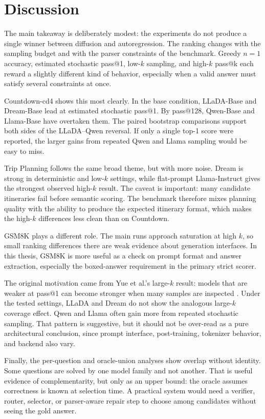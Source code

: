 \section{Discussion}
\label{sec:discussion}

The main takeaway is deliberately modest: the experiments do not produce a
single winner between diffusion and autoregression. The ranking changes with
the sampling budget and with the parser constraints of the benchmark. Greedy
$n=1$ accuracy, estimated stochastic pass@1, low-$k$ sampling, and high-$k$
pass@k each reward a slightly different kind of behavior, especially when a
valid answer must satisfy several constraints at once.

Countdown-cd4 shows this most clearly. In the base condition, LLaDA-Base and
Dream-Base lead at estimated stochastic pass@1. By pass@128, Qwen-Base and
Llama-Base have overtaken them. The paired bootstrap comparisons support both
sides of the LLaDA--Qwen reversal. If only a single top-1 score were reported,
the larger gains from repeated Qwen and Llama sampling would be easy to miss.

Trip Planning follows the same broad theme, but with more noise. Dream is
strong in deterministic and low-$k$ settings, while flat-prompt Llama-Instruct
gives the strongest observed high-$k$ result. The caveat is important: many
candidate itineraries fail before semantic scoring. The benchmark therefore
mixes planning quality with the ability to produce the expected itinerary
format, which makes the high-$k$ differences less clean than on Countdown.

GSM8K plays a different role. The main runs approach saturation at high $k$, so
small ranking differences there are weak evidence about generation interfaces.
In this thesis, GSM8K is more useful as a check on prompt format and answer
extraction, especially the boxed-answer requirement in the primary strict
scorer.

The original motivation came from Yue et al.'s large-$k$ result: models that are
weaker at pass@1 can become stronger when many samples are inspected
\cite{yue2025rlvr}. Under the tested settings, LLaDA and Dream do not show the
analogous large-$k$ coverage effect. Qwen and Llama often gain more from
repeated stochastic sampling. That pattern is suggestive, but it should not be
over-read as a pure architectural conclusion, since prompt interface,
post-training, tokenizer behavior, and backend also vary.

Finally, the per-question and oracle-union analyses show overlap without
identity. Some questions are solved by one model family and not another. That is
useful evidence of complementarity, but only as an upper bound: the oracle
assumes correctness is known at selection time. A practical system would need a
verifier, router, selector, or parser-aware repair step to choose among
candidates without seeing the gold answer.
